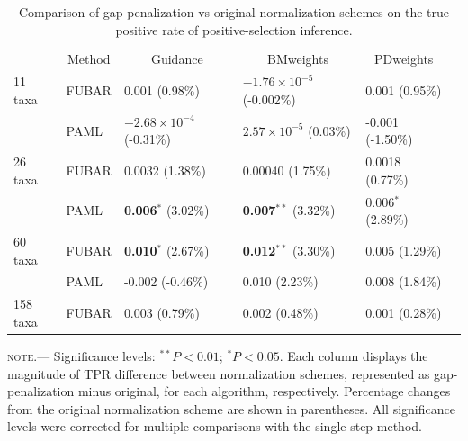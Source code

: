 \documentclass[10pt]{article}
\begin{document}
\begin{table}[H]
\caption {\label{tab:penalmodel} Comparison of gap-penalization vs original normalization schemes on the true positive rate of positive-selection inference.}
\begin{tabular}{l l l l l l}
\hline\noalign{\smallskip}
\multicolumn{1}{c}{Simulation Set} & \multicolumn{1}{c}{Method} & \multicolumn{1}{c}{Guidance} & \multicolumn{1}{c}{BMweights} & \multicolumn{1}{c}{PDweights} \\
\noalign{\smallskip}\hline\noalign{\smallskip}
11 taxa  & FUBAR & 0.001 (0.98\%) & $-1.76\times10^{-5}$ (-0.002\%) & 0.001 (0.95\%)\\
              & PAML & $-2.68\times10^{-4}$ (-0.31\%) & $2.57\times10^{-5}$ (0.03\%) & -0.001 (-1.50\%)\\
\hline
26 taxa   & FUBAR & 0.0032 (1.38\%) & 0.00040 (1.75\%) & 0.0018 (0.77\%)\\
              & PAML & \textbf{0.006}$^{\ast}$ (3.02\%) & \textbf{0.007}$^{\ast\ast}$ (3.32\%) & 0.006$^{\ast}$ (2.89\%) \\
\hline
60 taxa  & FUBAR & \textbf{0.010}$^{\ast}$ (2.67\%) & \textbf{0.012}$^{\ast\ast}$ (3.30\%)  & 0.005  (1.29\%)\\
              & PAML & -0.002 (-0.46\%) & 0.010 (2.23\%) & 0.008 (1.84\%) \\
\hline
158 taxa & FUBAR & 0.003 (0.79\%) & 0.002 (0.48\%) & 0.001 (0.28\%)\\
\hline
\end{tabular}
\newline
\textsc{note.}--- Significance levels: $^{\ast\ast} P < 0.01$; $^{\ast} P < 0.05$. Each column displays the magnitude of TPR difference between normalization schemes, represented as gap-penalization minus original, for each algorithm, respectively. Percentage changes from the original normalization scheme are shown in parentheses. All significance levels were corrected for multiple comparisons with the single-step method.
\end{table}
\end{document}
